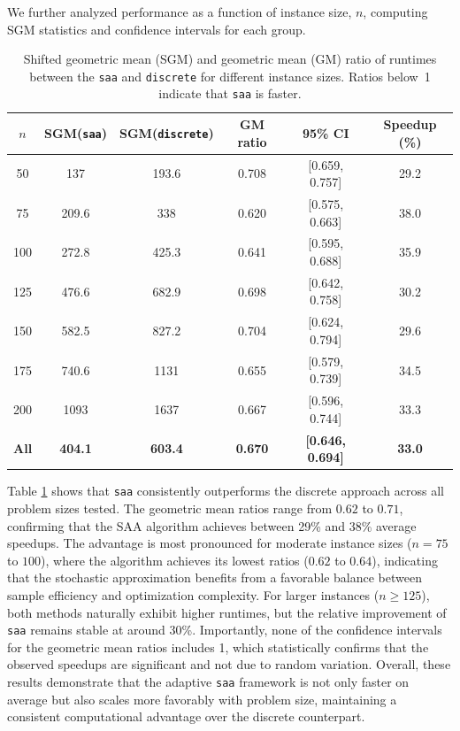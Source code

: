 \documentclass[letter,11pt, reqno]{amsart}
\renewcommand{\;}{\quad}
\theoremstyle{thmstyleone}%
\theoremstyle{thmstyletwo}%
\theoremstyle{thmstylethree}%
\begin{document}
We further analyzed performance as a function of instance size, $n$, computing SGM statistics and confidence intervals for each group.
\begin{table}[ht]
\centering
\renewcommand{\arraystretch}{0.9}
\setlength{\tabcolsep}{3pt}
\begin{tabular}{c c c c c c}
\toprule
$n$& \textbf{SGM(\texttt{saa})} & \textbf{SGM(\texttt{discrete})} & \textbf{GM ratio} & \textbf{95\% CI} & \textbf{Speedup (\%)} \\
\midrule
50 & 137 & 193.6 & 0.708 & [0.659, 0.757] & 29.2\\
75 & 209.6 & 338 & 0.620 & [0.575, 0.663] & 38.0\\
100 & 272.8 & 425.3 & 0.641 & [0.595, 0.688] & 35.9\\
125 & 476.6 & 682.9 & 0.698 & [0.642, 0.758] & 30.2\\
150 & 582.5 & 827.2 & 0.704 & [0.624, 0.794] & 29.6\\
175 & 740.6 & 1131 & 0.655 & [0.579, 0.739] & 34.5\\
200 & 1093 & 1637 & 0.667 & [0.596, 0.744] & 33.3\\
\midrule
\textbf{All}& 	\textbf{404.1}& \textbf{603.4} & \textbf{0.670} & \textbf{[0.646, 0.694]} &\textbf{ 33.0}\\
\bottomrule
\end{tabular}
\caption{Shifted geometric mean (SGM) and geometric mean (GM) ratio of runtimes between the \texttt{saa} and \texttt{discrete} for different instance sizes. Ratios below~1 indicate that \texttt{saa} is faster.}
\label{tab:performance-size}
\end{table}
Table \ref{tab:performance-size} shows that \texttt{saa} consistently outperforms the discrete approach across all problem sizes tested. 
The geometric mean ratios range from $0.62$ to $0.71$, confirming that the SAA algorithm achieves between 29\% and 38\% average speedups. 
The advantage is most pronounced for moderate instance sizes ($n=75$ to $100$), where the algorithm achieves its lowest ratios ($0.62$ to $0.64$), indicating that the stochastic approximation benefits from a favorable balance between sample efficiency and optimization complexity. 
For larger instances ($n\ge125$), both methods naturally exhibit higher runtimes, but the relative improvement of \texttt{saa} remains stable at around 30\%. 
Importantly, none of the confidence intervals for the geometric mean ratios includes 1, which statistically confirms that the observed speedups are significant and not due to random variation. 
Overall, these results demonstrate that the adaptive \texttt{saa} framework is not only faster on average but also scales more favorably with problem size, maintaining a consistent computational advantage over the discrete counterpart.
\end{document}
